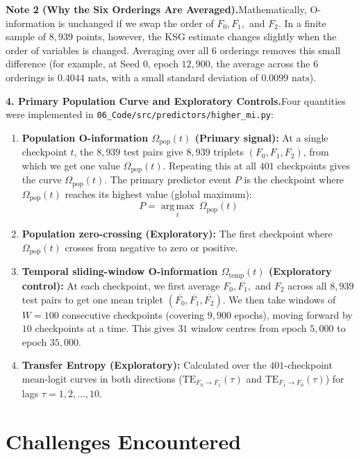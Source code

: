 \documentclass[11pt,a4paper,oneside]{report}
\newcommand{\Fzero}{F_{0}}
\newcommand{\Fone}{F_{1}}
\newcommand{\Ftwo}{F_{2}}
\newcommand{\Omegapop}{\Omega_{\mathrm{pop}}}
\newcommand{\Omegatemp}{\Omega_{\mathrm{temp}}}
\begin{document}
\noindent\textbf{Note 2 (Why the Six Orderings Are Averaged).}\quad Mathematically, O-information is unchanged if we swap the order of $\Fzero, \Fone,$ and $\Ftwo$. In a finite sample of $8{,}939$ points, however, the KSG estimate changes slightly when the order of variables is changed. Averaging over all $6$ orderings removes this small difference (for example, at Seed 0, epoch $12{,}900$, the average across the $6$ orderings is $0.4044\text{ nats}$, with a small standard deviation of $0.0099\text{ nats}$).

\medskip
\noindent\textbf{4. Primary Population Curve and Exploratory Controls.}\quad Four quantities were implemented in \texttt{06\_Code/src/predictors/higher\_mi.py}:
\begin{enumerate}[label=\textbf{(\roman*)}]
\item \textbf{Population O-information $\Omegapop(t)$ (Primary signal):} At a single checkpoint $t$, the $8{,}939$ test pairs give $8{,}939$ triplets $(\Fzero, \Fone, \Ftwo)$, from which we get one value $\Omegapop(t)$. Repeating this at all $401$ checkpoints gives the curve $\Omegapop(t)$. The primary predictor event $P$ is the checkpoint where $\Omegapop(t)$ reaches its highest value (global maximum):
\begin{equation}
\boxed{P = \underset{t}{\operatorname{arg\,max}}\ \Omegapop(t)}
\end{equation}
\item \textbf{Population zero-crossing (Exploratory):} The first checkpoint where $\Omegapop(t)$ crosses from negative to zero or positive.
\item \textbf{Temporal sliding-window O-information $\Omegatemp(t)$ (Exploratory control):} At each checkpoint, we first average $\Fzero, \Fone,$ and $\Ftwo$ across all $8{,}939$ test pairs to get one mean triplet $(\overline{\Fzero}, \overline{\Fone}, \overline{\Ftwo})$. We then take windows of $W = 100$ consecutive checkpoints (covering $9{,}900$ epochs), moving forward by $10$ checkpoints at a time. This gives $31$ window centres from epoch $5{,}000$ to epoch $35{,}000$.
\item \textbf{Transfer Entropy (Exploratory):} Calculated over the $401$-checkpoint mean-logit curves in both directions ($\mathrm{TE}_{\Fzero \to \Fone}(\tau)$ and $\mathrm{TE}_{\Fone \to \Fzero}(\tau)$) for lags $\tau = 1, 2, \ldots, 10$.
\end{enumerate}

\section{Challenges Encountered}
\end{document}
